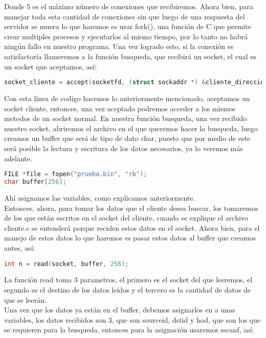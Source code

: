 \documentclass{article}
\begin{document}
Donde 5 es el máximo número de conexiones que recibiremos.
Ahora bien, para manejar toda esta cantidad de conexiones sin que luego de una respuesta del servidor se muera lo que haremos es usar fork()\cite{man7fork}, una función de C que permite crear multiples procesos y ejecutarlos al mismo tiempo, por lo tanto no habrá ningún fallo en nuestro programa.
Una vez logrado esto, si la conexión es satisfactoría llameremos a la función busqueda, que recibirá un socket, el cual es un socket que aceptamos, así:
\begin{lstlisting}[language=C]
socket_cliente = accept(socketfd, (struct sockaddr *) &cliente_direccion, &tamano_cliente);
\end{lstlisting}
Con esta línea de codigo hacemos lo anteriormente mencionado, aceptamos\cite{man7accept} un socket cliente, entonces, una vez aceptado podremos acceder a los mismos metodos de un socket normal.
En nuestra función busqueda, una vez recibido nuestro socket, abriremos el archivo en el que queremos hacer la busqueda, luego creamos un buffer que será de tipo de dato char, puesto que por medio de este será posible la lectura y escritura de los datos necesarios, ya lo veremos más adelante.


\begin{lstlisting}[language=C]
FILE *file = fopen("prueba.bin", "rb");
char buffer[256];
\end{lstlisting}


Ahí asignamos las variables, como explicamos anteriormente.\\ 
Entonces, ahora, para tomar los datos que el cliente desea buscar, los tomaremos de los que están escritos en el socket del cliente, cuando se explique el archivo cliente.c se entenderá porque reciden estos datos en el socket. Ahora bien, para el manejo de estos datos lo que haremos es pasar estos datos al buffer que creamos antes, así:


\begin{lstlisting}[language=C]
int n = read(socket, buffer, 256);
\end{lstlisting}

La función read\cite{man7read} toma 3 parametros, el primero es el socket del que leeremos, el segundo es el destino de los datos leídos y el tercero es la cantidad de datos de que se leerán.\\ 
Una vez que los datos ya están en el buffer, debemos asignarlos en a unas variables, los datos recibidos son 3, que son sourceid, dstid y hod, que son los que se requieren para la busqueda, entonces para la asignación usaremos sscanf\cite{man7sscanf}, así:
\end{document}
